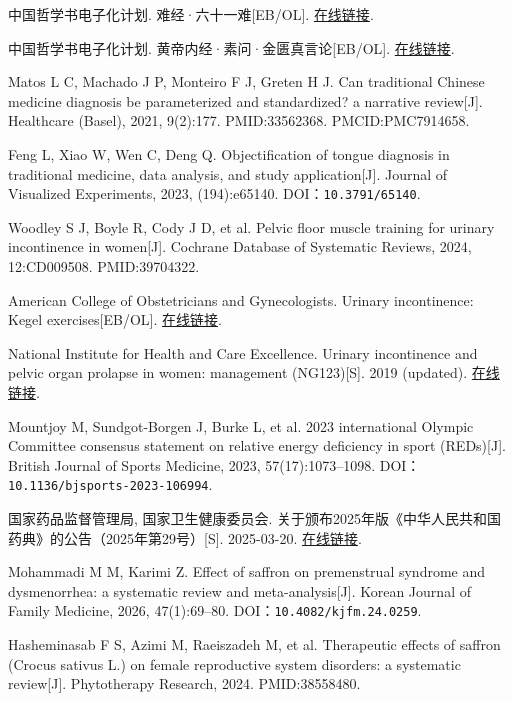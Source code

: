 \begin{enumerate}[label={[Q\arabic*]},leftmargin=*]
  \item 中国哲学书电子化计划. 难经·六十一难[EB/OL]. \href{https://ctext.org/nan-jing/shen-sheng-gong-qiao/zh}{在线链接}.
  \item 中国哲学书电子化计划. 黄帝内经·素问·金匮真言论[EB/OL]. \href{https://ctext.org/huangdi-neijing/jin-gui-zhen-yan-lun/zhs}{在线链接}.
  \item Matos L C, Machado J P, Monteiro F J, Greten H J. Can traditional Chinese medicine diagnosis be parameterized and standardized? a narrative review[J]. Healthcare (Basel), 2021, 9(2):177. PMID:33562368. PMCID:PMC7914658.
  \item Feng L, Xiao W, Wen C, Deng Q. Objectification of tongue diagnosis in traditional medicine, data analysis, and study application[J]. Journal of Visualized Experiments, 2023, (194):e65140. DOI：\nolinkurl{10.3791/65140}.
  \item Woodley S J, Boyle R, Cody J D, et al. Pelvic floor muscle training for urinary incontinence in women[J]. Cochrane Database of Systematic Reviews, 2024, 12:CD009508. PMID:39704322.
  \item American College of Obstetricians and Gynecologists. Urinary incontinence: Kegel exercises[EB/OL]. \href{https://www.acog.org/womens-health/faqs/urinary-incontinence}{在线链接}.
  \item National Institute for Health and Care Excellence. Urinary incontinence and pelvic organ prolapse in women: management (NG123)[S]. 2019 (updated). \href{https://www.nice.org.uk/guidance/ng123}{在线链接}.
  \item Mountjoy M, Sundgot-Borgen J, Burke L, et al. 2023 international Olympic Committee consensus statement on relative energy deficiency in sport (REDs)[J]. British Journal of Sports Medicine, 2023, 57(17):1073–1098. DOI：\nolinkurl{10.1136/bjsports-2023-106994}.
  \item 国家药品监督管理局, 国家卫生健康委员会. 关于颁布2025年版《中华人民共和国药典》的公告（2025年第29号）[S]. 2025-03-20. \href{https://www.nmpa.gov.cn/xxgk/fgwj/gzwj/gzwjyp/20250325183810122.html}{在线链接}.
  \item Mohammadi M M, Karimi Z. Effect of saffron on premenstrual syndrome and dysmenorrhea: a systematic review and meta-analysis[J]. Korean Journal of Family Medicine, 2026, 47(1):69–80. DOI：\nolinkurl{10.4082/kjfm.24.0259}.
  \item Hasheminasab F S, Azimi M, Raeiszadeh M, et al. Therapeutic effects of saffron (Crocus sativus L.) on female reproductive system disorders: a systematic review[J]. Phytotherapy Research, 2024. PMID:38558480.

\end{enumerate}

